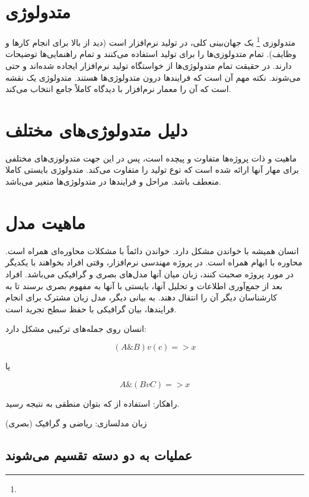 \documentclass[a4paper]{article}
\begin{document}
\section{متدولوژی}

متدولوزی \footnote{} یک جهان‌بینی کلی، در تولید نرم‌افزار است
(دید از بالا برای انجام کار‌ها و وظایف). تمام متدولوزی‌ها را برای تولید استفاده
می‌کنند و تمام راهنمایی‌ها توضیحات دارند. در حقیقت تمام متدولوژی‌ها از خواستگاه
تولید نرم‌افزار ایجاده شده‌اند و حتی می‌شوند. نکته مهم آن است که فرایند‌ها درون
متدولوژی‌ها هستند. متدولوژی یک نقشه است که آن را معمار نرم‌افزار با دیدگاه
کاملاً جامع انتخاب می‌کند.

\section{دلیل متدولوژی‌های مختلف}

ماهیت و ذات پروژه‌ها متفاوت و پیچده‌ است، پس در این جهت متدولوزی‌های مختلفی برای
مهار آنها ارائه شده است که توع تولید را متفاوت می‌کند. متدولوژی بایستی کاملا
منعطف باشد. مراحل و فرایند‌ها در متدولوژی‌ها متغیر می‌باشد.

\section{ماهیت مدل}

انسان همیشه با خواندن مشکل دارد. خواندن دائماً با مشکلات محاوره‌ای همراه است.
محاوره با ابهام همراه است. در پروژه مهندسی نرم‌افزار، وقتی افراد بخواهند با
یکدیگر در مورد پروژه صحبت کنند، زبان میان آنها مدل‌های بصری و گرافیکی می‌باشد.
افراد بعد از جمع‌آوری اطلاعات و تحلیل آنها، بایستی با آنها به مفهوم بصری برسند
تا به کارشناسان دیگر آن را انتقال دهند. به بیانی دیگر، مدل زبان مشترک برای انجام
فرایند‌ها، بیان گرافیکی با حفظ سطح تجرید است.

انسان روی جمله‌های ترکیبی مشکل دارد: 

\begin{equation}
  \label{eq:مقایسه عملگر‌ها}
  (A \& B) v (c) => x
\end{equation}

یا

\begin{equation}
  \label{eq:مقایسه عملگر‌ها}
  A \& (B v C) => x
\end{equation}

راهکار: استفاده از  که بتوان منطقی به نتیجه رسید.

زبان مدلسازی: ریاضی و گرافیک (بصری)

\subsection*{عملیات به دو دسته تقسیم می‌شوند}
\end{document}
